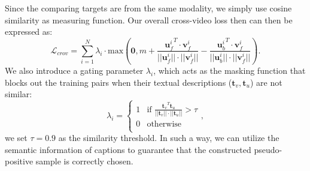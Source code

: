 Since the comparing targets are from the same modality, we simply use cosine similarity as measuring function.
Our overall cross-video loss then can then be expressed as:
\begin{equation}
    \mathcal{L}_{crov} = \sum_{i=1}^{N}\lambda_i\cdot
    \text{max}(\textbf{0}, m + \frac{{\boldsymbol{u}_f^i}^T \cdot \boldsymbol{v}_f^i}{||{\boldsymbol{u}_f^i}||\cdot ||\boldsymbol{v}_f^i||} - \frac{{\boldsymbol{u}_b^i}^T \cdot \boldsymbol{v}_f^i}{||\boldsymbol{u}_b^i||\cdot ||\boldsymbol{v}_f^i||}).
    \label{equation:lcrov}
\end{equation}
We also introduce a gating parameter $\lambda_i$, which acts as the masking function that blocks out the training pairs when their textual descriptions ($\boldsymbol{t}_v, \boldsymbol{t}_u$) are not similar:
\begin{equation}
      \lambda_{i} =
    \begin{cases}
      1 & \text{if } \frac{{\boldsymbol{t}_v}^{T}{\boldsymbol{t}_u}}{||\boldsymbol{t}_v||\cdot||\boldsymbol{t}_u||} > \tau\\
      0 & \text{otherwise}\\
    \end{cases},
\end{equation}
we set $\tau=0.9$ as the similarity threshold. In such a way, we can utilize the semantic information of captions to guarantee that the constructed pseudo-positive sample is correctly chosen.

